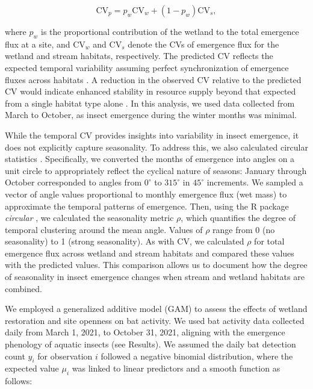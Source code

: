 \documentclass[11pt, class=article, crop=false]{standalone}
\begin{document}
\begin{equation}
    \mbox{CV}_p = p_w \mbox{CV}_w + (1 - p_w) \mbox{CV}_s,
\end{equation}

where $p_w$ is the proportional contribution of the wetland to the total emergence flux at a site, and $\mbox{CV}_w$ and $\mbox{CV}_s$ denote the CVs of emergence flux for the wetland and stream habitats, respectively. 
The predicted CV reflects the expected temporal variability assuming perfect synchronization of emergence fluxes across habitats \citep{thibaut_understanding_2013, moore_lifehistory_2014}.
A reduction in the observed CV relative to the predicted CV would indicate enhanced stability in resource supply beyond that expected from a single habitat type alone \citep{thibaut_understanding_2013, moore_lifehistory_2014}.
In this analysis, we used data collected from March to October, as insect emergence during the winter months was minimal.

While the temporal CV provides insights into variability in insect emergence, it does not explicitly capture seasonality. 
To address this, we also calculated circular statistics \citep{nash_latitudinal_2023, staggemeier_circular_2020}.
Specifically, we converted the months of emergence into angles on a unit circle to appropriately reflect the cyclical nature of seasons: January through October corresponded to angles from $0^\circ$ to $315^\circ$ in $45^\circ$ increments.
We sampled a vector of angle values proportional to monthly emergence flux (wet mass) to approximate the temporal patterns of emergence.
Then, using the R package \textit{circular} \citep{agostinelli_r_2024}, we calculated the seasonality metric $\rho$, which quantifies the degree of temporal clustering around the mean angle.
Values of $\rho$ range from 0 (no seasonality) to 1 (strong seasonality).
As with CV, we calculated $\rho$ for total emergence flux across wetland and stream habitats and compared these values with the predicted values.
This comparison allows us to document how the degree of seasonality in insect emergence changes when stream and wetland habitats are combined.

We employed a generalized additive model (GAM) to assess the effects of wetland restoration and site openness on bat activity.
We used bat activity data collected daily from March 1, 2021, to October 31, 2021, aligning with the emergence phenology of aquatic insects (see Results).
We assumed the daily bat detection count $y_i$ for observation $i$ followed a negative binomial distribution, where the expected value $\mu_i$ was linked to linear predictors and a smooth function as follows:
\end{document}
